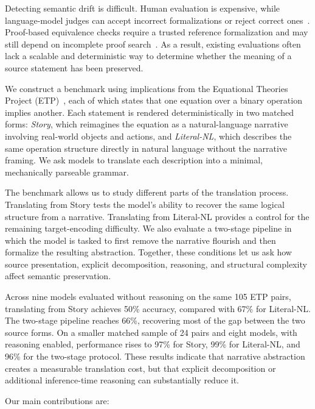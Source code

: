 \documentclass{article}
\begin{document}
Detecting semantic drift is difficult. Human evaluation is expensive, while language-model judges can accept incorrect formalizations or reject correct
ones~\citep{kimina2025,chen2025reform}. Proof-based equivalence checks require a trusted reference formalization and may still depend on incomplete proof search~\citep{liu2025rethinking,poiroux2025reliable,murphy2024leaneuclid}. As a result, existing evaluations often lack a scalable and deterministic way to determine whether the meaning of a source statement has been preserved.



We construct a benchmark using implications from the Equational Theories Project (ETP)~\citep{bolan2025etp}, each of which states that one equation over a binary operation implies another. Each statement is rendered
deterministically in two matched forms: \textit{Story}, which reimagines the equation as a natural-language narrative involving real-world objects and actions, and \textit{Literal-NL}, which
describes the same operation structure directly in natural language without the narrative framing. We ask models to translate each description into a
minimal, mechanically parseable grammar.

The benchmark allows us to study different parts of the translation process. Translating from Story tests the model's ability to
recover the same logical structure from a narrative. Translating from Literal-NL provides a control for the
remaining target-encoding difficulty. We  also evaluate a two-stage pipeline in which the model is tasked to first remove the narrative flourish and then
formalize the resulting abstraction. Together, these conditions let us ask
how source presentation, explicit decomposition, reasoning, and structural
complexity affect semantic preservation.

Across nine models evaluated without reasoning on the same 105 ETP pairs,
translating from Story achieves 50\% accuracy, compared with 67\% for
Literal-NL. The two-stage pipeline reaches 66\%, recovering most of the gap
between the two source forms. On a smaller matched sample of 24 pairs and eight models, with reasoning enabled, performance rises to
97\% for Story, 99\% for Literal-NL, and 96\% for the two-stage protocol.
These results indicate that narrative abstraction creates a measurable
translation cost, but that explicit decomposition or additional
inference-time reasoning can substantially reduce it.

Our main contributions are:
\end{document}
